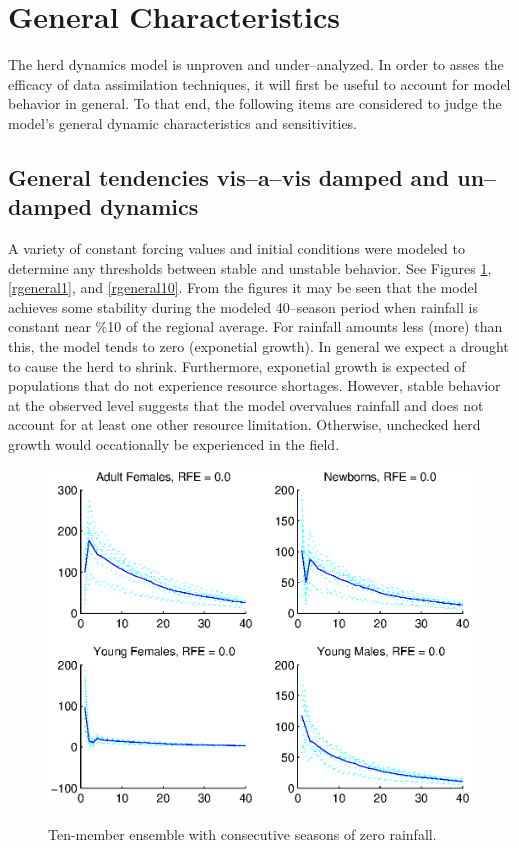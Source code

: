 \documentclass[fleqn, letterpaper]{amsart}
\begin{document}
\section{General Characteristics}
The herd dynamics model is unproven and under--analyzed. In order to asses the efficacy of data assimilation techniques, it will first be useful to account for model behavior in general. 
To that end, the following items are considered to judge the model's general dynamic characteristics and sensitivities. 

\subsection{General tendencies vis--a--vis damped and un--damped dynamics}
A variety of constant forcing values and initial conditions were modeled to determine any thresholds between stable and unstable behavior.
See Figures \ref{general0}, \ref{rgeneral1}, and \ref{rgeneral10}.
From the figures it may be seen that the model achieves some stability during the modeled 40--season period when rainfall is constant near \%10 of the regional average. For rainfall amounts less (more) than this, the model tends to zero (exponetial growth). In general we expect a drought to cause the herd to shrink. Furthermore, exponetial growth is expected of populations that do not experience resource shortages. However, stable behavior at the observed level suggests that the model overvalues rainfall and does not account for at least one other resource limitation. Otherwise, unchecked herd growth would occationally be experienced in the field. 
\begin{figure}
\includegraphics[width=\textwidth]{general0}
\label{general0}
\caption{Ten-member ensemble with consecutive seasons of zero rainfall.}
\end{figure}
\end{document}
